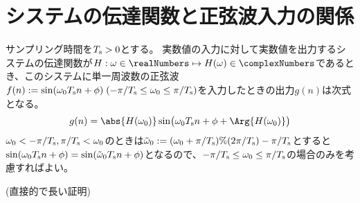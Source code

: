     \section{システムの伝達関数と正弦波入力の関係}
        \begin{shadebox}
            サンプリング時間を$T_\text{s}>0$とする。
            実数値の入力に対して実数値を出力するシステムの伝達関数が$H:\omega\in\realNumbers\mapsto H(\omega)\in\complexNumbers$であるとき、このシステムに単一周波数の正弦波$f(n) := \sin(\omega_0 T_\text{s} n + \phi)\;(-\pi/T_\text{s}\leq\omega_0\leq\pi/T_\text{s})$を入力したときの出力$g(n)$は次式となる。
            \[ g(n) = \abs{H(\omega_0)}\sin\bigl(\omega_0 \Ts n + \phi + \Arg{H(\omega_0)}\bigr) \]
            $\omega_0<-\pi/T_\text{s}, \pi/T_\text{s}<\omega_0$のときは$\tilde{\omega}_0 := (\omega_0+\pi/T_\text{s})\%(2\pi/T_\text{s})-\pi/T_\text{s}$とすると$\sin(\omega_0 T_\text{s} n + \phi) = \sin(\tilde{\omega}_0 T_\text{s} n + \phi)$となるので、$-\pi/T_\text{s}\leq\omega_0\leq\pi/T_\text{s}$の場合のみを考慮すればよい。
        \end{shadebox}
        (直接的で長い証明)
